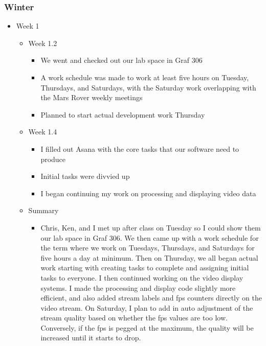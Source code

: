 \subsubsection{Winter}
\begin{itemize}
\item Week 1
	\begin{itemize}
	\item Week 1.2
      \begin{itemize}
      \item We went and checked out our lab space in Graf 306 
      \item A work schedule was made to work at least five hours on Tuesday, Thursdays, and Saturdays, with the Saturday work overlapping with the Mars Rover weekly meetings 
      \item Planned to start actual development work Thursday 
      \end{itemize}
	\item Week 1.4
      \begin{itemize}
      \item I filled out Asana with the core tasks that our software need to produce 
      \item Initial tasks were divvied up 
      \item I began continuing my work on processing and displaying video data 
      \end{itemize}
    
    \item Summary
      \begin{itemize}
      \item Chris, Ken, and I met up after class on Tuesday so I could show them our lab space in Graf 306. We then came up with a work schedule for the term where we work on Tuesdays, Thursdays, and Saturdays for five hours a day at minimum. Then on Thursday, we all began actual work starting with creating tasks to complete and assigning initial tasks to everyone. I then continued working on the video display systems. I made the processing and display code slightly more efficient, and also added stream labels and fps counters directly on the video stream. On Saturday, I plan to add in auto adjustment of the stream quality based on whether the fps values are too low. Conversely, if the fps is pegged at the maximum, the quality will be increased until it starts to drop. 
      \end{itemize}
	\end{itemize}


\end{itemize}

